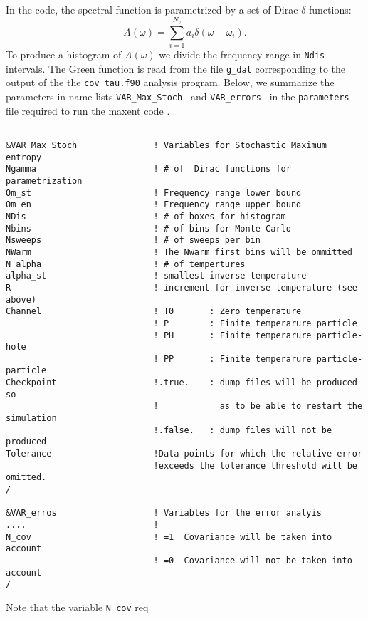 In the code, the spectral function is parametrized  by a  set of Dirac $\delta$ functions: 
\begin{equation}
      A(\omega)  = \sum_{i=1}^{N_{\gamma}} a_{i} \delta \left( \omega - \omega_i \right).
\end{equation}
To produce a histogram of  $ A(\omega) $ we divide  the frequency range in \texttt{Ndis} intervals. 
The Green function is read from the file \texttt{g\_dat}  corresponding to the  output of the the  \texttt{cov\_tau.f90} analysis program.  
Below, we summarize the  parameters   in   name-lists  \texttt{VAR\_Max\_Stoch }  and  \texttt{VAR\_errors }   in the  \texttt{parameters}  file   required  to run the maxent code .  
\lstset{style=fortran}
\begin{lstlisting} 

&VAR_Max_Stoch               ! Variables for Stochastic Maximum entropy
Ngamma                       ! # of  Dirac functions for parametrization
Om_st                        ! Frequency range lower bound
Om_en                        ! Frequency range upper bound
NDis                         ! # of boxes for histogram
Nbins                        ! # of bins for Monte Carlo
Nsweeps                      ! # of sweeps per bin
NWarm                        ! The Nwarm first bins will be ommitted
N_alpha                      ! # of tempertures
alpha_st                     ! smallest inverse temperature
R                            ! increment for inverse temperature (see above) 
Channel                      ! T0       : Zero temperature
                             ! P        : Finite temperarure particle 
                             ! PH       : Finite temperarure particle-hole
                             ! PP       : Finite temperarure particle-particle 
Checkpoint                   !.true.    : dump files will be produced so  
                             !            as to be able to restart the simulation
                             !.false.   : dump files will not be produced 
Tolerance                    !Data points for which the relative error
                             !exceeds the tolerance threshold will be omitted.
/

&VAR_erros                   ! Variables for the error analyis
....                         !
N_cov                        ! =1  Covariance will be taken into account
                             ! =0  Covariance will not be taken into account 
/
\end{lstlisting}
Note that the variable  \texttt{N\_cov}  req

